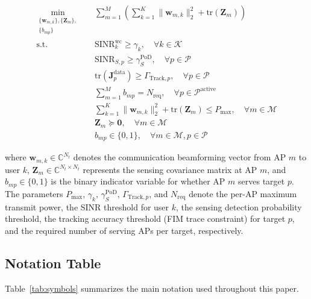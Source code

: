 \documentclass[12pt,a4paper]{article}
\newcommand{\vect}[1]{\mathbf{#1}}
\newcommand{\mat}[1]{\mathbf{#1}}
\newcommand{\norm}[1]{\|#1\|_2}
\newcommand{\tr}{\text{tr}}
\begin{document}
\begin{align}
\min_{\substack{\{\vect{w}_{m,k}\}, \{\mat{Z}_m\}, \\ \{b_{mp}\}}} \quad & \sum_{m=1}^{M} \left( \sum_{k=1}^{K} \norm{\vect{w}_{m,k}}^2 + \tr(\mat{Z}_m) \right) \tag{P1} \\
\text{s.t.} \quad & \text{SINR}_k^{\text{wc}} \geq \gamma_k, \quad \forall k \in \mathcal{K} \label{eq:sinr_comm} \\
& \text{SINR}_{S,p} \geq \gamma_S^{\text{PoD}}, \quad \forall p \in \mathcal{P} \label{eq:sinr_sens} \\
& \tr(\mat{J}_p^{\text{data}}) \geq \Gamma_{\text{Track}, p}, \quad \forall p \in \mathcal{P} \label{eq:pcrb} \\
& \sum_{m=1}^{M} b_{mp} = N_{\text{req}}, \quad \forall p \in \mathcal{P}^{\text{active}} \label{eq:ap_select} \\
& \sum_{k=1}^{K} \norm{\vect{w}_{m,k}}^2 + \tr(\mat{Z}_m) \leq P_{\max}, \quad \forall m \in \mathcal{M} \label{eq:power} \\
& \mat{Z}_m \succeq \mat{0}, \quad \forall m \in \mathcal{M} \label{eq:psd} \\
& b_{mp} \in \{0, 1\}, \quad \forall m \in \mathcal{M}, p \in \mathcal{P} \label{eq:binary}
\end{align}

where $\vect{w}_{m,k} \in \mathbb{C}^{N_t}$ denotes the communication beamforming vector from AP $m$ to user $k$, $\mat{Z}_m \in \mathbb{C}^{N_t \times N_t}$ represents the sensing covariance matrix at AP $m$, and $b_{mp} \in \{0,1\}$ is the binary indicator variable for whether AP $m$ serves target $p$. The parameters $P_{\max}$, $\gamma_k$, $\gamma_S^{\text{PoD}}$, $\Gamma_{\text{Track},p}$, and $N_{\text{req}}$ denote the per-AP maximum transmit power, the SINR threshold for user $k$, the sensing detection probability threshold, the tracking accuracy threshold (FIM trace constraint) for target $p$, and the required number of serving APs per target, respectively.

\subsection{Notation Table}

Table~\ref{tab:symbols} summarizes the main notation used throughout this paper.
\end{document}
